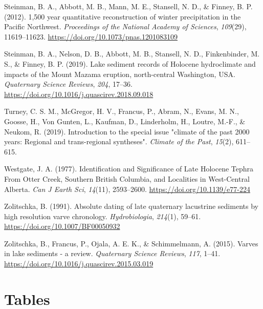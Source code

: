 \documentclass[
  letterpaper,
  DIV=11,
  numbers=noendperiod]{scrartcl}
\newlength{\cslhangindent}
\newlength{\cslentryspacingunit} %
\newenvironment{CSLReferences}[2] %
 {%
  \setlength{\parindent}{0pt}
  \ifodd #1
  \let\oldpar\par
  \def\par{\hangindent=\cslhangindent\oldpar}
  \fi
  \setlength{\parskip}{#2\cslentryspacingunit}
 }%
 {}
\begin{document}
\begin{CSLReferences}{1}{0}
\leavevmode{}%
Steinman, B. A., Abbott, M. B., Mann, M. E., Stansell, N. D., \& Finney,
B. P. (2012). {1,500 year quantitative reconstruction of winter
precipitation in the Pacific Northwest}. \emph{Proceedings of the
National Academy of Sciences}, \emph{109}(29), 11619--11623.
\url{https://doi.org/10.1073/pnas.1201083109}

\leavevmode{}%
Steinman, B. A., Nelson, D. B., Abbott, M. B., Stansell, N. D.,
Finkenbinder, M. S., \& Finney, B. P. (2019). {Lake sediment records of
Holocene hydroclimate and impacts of the Mount Mazama eruption,
north-central Washington, USA}. \emph{Quaternary Science Reviews},
\emph{204}, 17--36.
\url{https://doi.org/10.1016/j.quascirev.2018.09.018}

\leavevmode{}%
Turney, C. S. M., McGregor, H. V., Francus, P., Abram, N., Evans, M. N.,
Goosse, H., Von Gunten, L., Kaufman, D., Linderholm, H., Loutre, M.-F.,
\& Neukom, R. (2019). {Introduction to the special issue "climate of the
past 2000 years: Regional and trans-regional syntheses"}. \emph{Climate
of the Past}, \emph{15}(2), 611--615.

\leavevmode{}%
Westgate, J. A. (1977). {Identification and Significance of Late
Holocene Tephra From Otter Creek, Southern British Columbia, and
Localities in West-Central Alberta.} \emph{Can J Earth Sci},
\emph{14}(11), 2593--2600. \url{https://doi.org/10.1139/e77-224}

\leavevmode{}%
Zolitschka, B. (1991). {Absolute dating of late quaternary lacustrine
sediments by high resolution varve chronology}. \emph{Hydrobiologia},
\emph{214}(1), 59--61. \url{https://doi.org/10.1007/BF00050932}

\leavevmode{}%
Zolitschka, B., Francus, P., Ojala, A. E. K., \& Schimmelmann, A.
(2015). {Varves in lake sediments - a review}. \emph{Quaternary Science
Reviews}, \emph{117}, 1--41.
\url{https://doi.org/10.1016/j.quascirev.2015.03.019}

\end{CSLReferences}

\pagebreak

\hypertarget{tables}{%
\section{Tables}\label{tables}}
\end{document}
